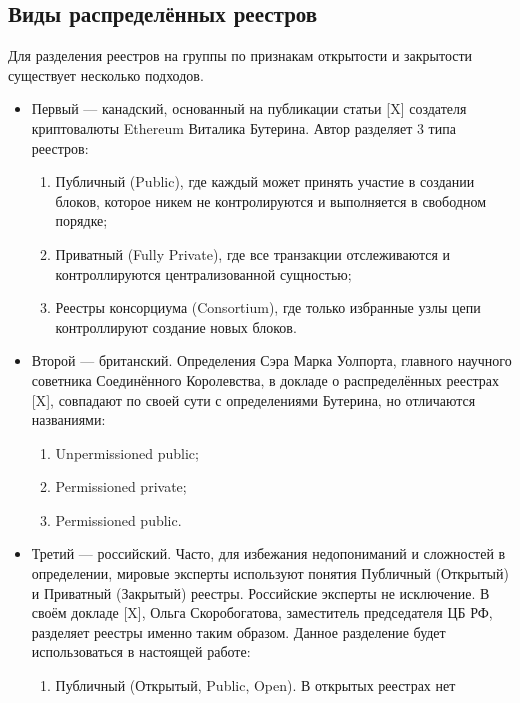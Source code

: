 \subsection{Виды распределённых реестров}\label{kinds_reestrs}
Для разделения реестров на группы по признакам открытости и закрытости
существует несколько подходов.
\begin{itemize}
    \item Первый --- канадский, основанный на публикации статьи [X] создателя
        криптовалюты Ethereum Виталика Бутерина. Автор разделяет 3 типа
        реестров:
          \begin{enumerate}
              \item Публичный (Public), где каждый может принять участие в
                  создании блоков, которое никем не контролируются и
                  выполняется в свободном порядке;
              \item Приватный (Fully Private), где все транзакции отслеживаются
                  и контроллируются централизованной сущностью;
              \item Реестры консорциума (Consortium), где только избранные узлы
                  цепи контроллируют создание новых блоков.
          \end{enumerate}
     \item Второй --- британский. Определения Сэра Марка Уолпорта, главного
         научного советника Соединённого Королевства, в докладе о
         распределённых реестрах [X], совпадают по своей сути с определениями
         Бутерина, но отличаются названиями:
         \begin{enumerate}
                 \item Unpermissioned public;
                 \item Permissioned private;
                 \item Permissioned public.
         \end{enumerate}
     \item Третий --- российский. Часто, для избежания недопониманий и
         сложностей в определении, мировые эксперты используют понятия
         Публичный (Открытый) и Приватный (Закрытый) реестры. Российские
         эксперты не исключение. В своём докладе [X], Ольга Скоробогатова,
         заместитель председателя ЦБ РФ, разделяет реестры именно таким
         образом. Данное разделение будет использоваться в настоящей работе:
         \begin{enumerate}
             \item Публичный (Открытый, Public, Open). В открытых реестрах нет

\end{enumerate}
\end{itemize}
